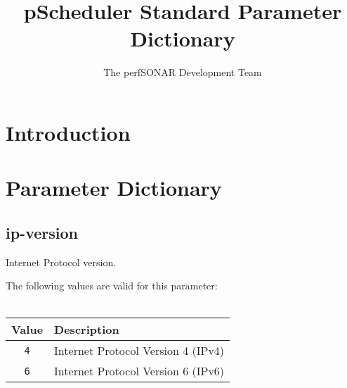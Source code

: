 \documentclass[10pt]{article}
\title{pScheduler Standard Parameter Dictionary}
\author{The perfSONAR Development Team}
\begin{document}
\maketitle


%
%


\def\valids#1{
  {The following values are valid for this parameter:}\\
  \\
  \hspace*{4em}\begin{tabular}{|c|l|}
    \hline
        {\bf Value} & {\bf Description} \\
        \hline
        #1
        \hline
  \end{tabular}
}

\def\value#1#2{{\tt #1} & {#2}\\}



%
%

\section{Introduction}



%
%

\section{Parameter Dictionary}



\subsection{ip-version}
Internet Protocol version.

\valids{
  \value{4}{Internet Protocol Version 4 (IPv4)}
  \value{6}{Internet Protocol Version 6 (IPv6)}
}
\end{document}
